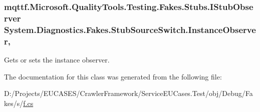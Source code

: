 \hypertarget{class_system_1_1_diagnostics_1_1_fakes_1_1_stub_source_switch_a96995c3802f8c8b3ae8c885925b030db}{
\subsubsection[{Instance\-Observer}]{\setlength{\rightskip}{0pt plus 5cm}mqttf.\-Microsoft.\-Quality\-Tools.\-Testing.\-Fakes.\-Stubs.\-I\-Stub\-Observer System.\-Diagnostics.\-Fakes.\-Stub\-Source\-Switch.\-Instance\-Observer\hspace{0.3cm}{\ttfamily [get]}, {\ttfamily [set]}}}\label{class_system_1_1_diagnostics_1_1_fakes_1_1_stub_source_switch_a96995c3802f8c8b3ae8c885925b030db}


Gets or sets the instance observer.



The documentation for this class was generated from the following file\-:\begin{DoxyCompactItemize}
\item 
D\-:/\-Projects/\-E\-U\-C\-A\-S\-E\-S/\-Crawler\-Framework/\-Service\-E\-U\-Cases.\-Test/obj/\-Debug/\-Fakes/s/\hyperlink{s_2f_8cs}{f.\-cs}\end{DoxyCompactItemize}
